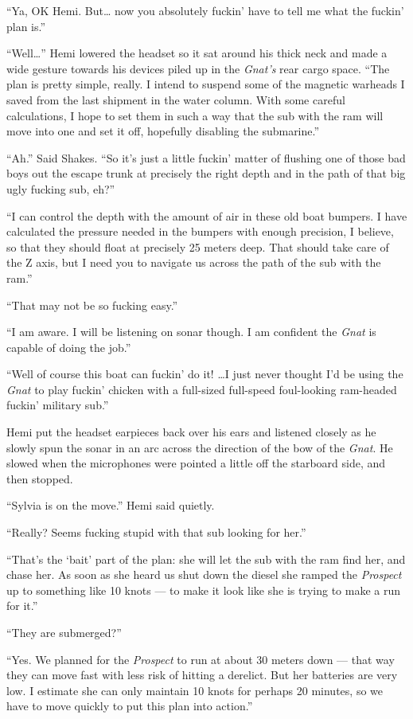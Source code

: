 \documentclass[
]{scrbook}
\begin{document}
``Ya, OK Hemi. But\ldots{} now you absolutely fuckin' have to tell me
what the fuckin' plan is.''

``Well\ldots{}'' Hemi lowered the headset so it sat around his thick
neck and made a wide gesture towards his devices piled up in the
\emph{Gnat's} rear cargo space. ``The plan is pretty simple, really. I
intend to suspend some of the magnetic warheads I saved from the last
shipment in the water column. With some careful calculations, I hope to
set them in such a way that the sub with the ram will move into one and
set it off, hopefully disabling the submarine.''

``Ah.'' Said Shakes. ``So it's just a little fuckin' matter of flushing
one of those bad boys out the escape trunk at precisely the right depth
and in the path of that big ugly fucking sub, eh?''

``I can control the depth with the amount of air in these old boat
bumpers. I have calculated the pressure needed in the bumpers with
enough precision, I believe, so that they should float at precisely 25
meters deep. That should take care of the Z axis, but I need you to
navigate us across the path of the sub with the ram.''

``That may not be so fucking easy.''

``I am aware. I will be listening on sonar though. I am confident the
\emph{Gnat} is capable of doing the job.''

``Well of course this boat can fuckin' do it! \ldots I just never
thought I'd be using the \emph{Gnat} to play fuckin' chicken with a
full-sized full-speed foul-looking ram-headed fuckin' military sub.''

Hemi put the headset earpieces back over his ears and listened closely
as he slowly spun the sonar in an arc across the direction of the bow of
the \emph{Gnat}. He slowed when the microphones were pointed a little
off the starboard side, and then stopped.

``Sylvia is on the move.'' Hemi said quietly.

``Really? Seems fucking stupid with that sub looking for her.''

``That's the `bait' part of the plan: she will let the sub with the ram
find her, and chase her. As soon as she heard us shut down the diesel
she ramped the \emph{Prospect} up to something like 10 knots --- to make
it look like she is trying to make a run for it.''

``They are submerged?''

``Yes. We planned for the \emph{Prospect} to run at about 30 meters down
--- that way they can move fast with less risk of hitting a derelict.
But her batteries are very low. I estimate she can only maintain 10
knots for perhaps 20 minutes, so we have to move quickly to put this
plan into action.''
\end{document}
